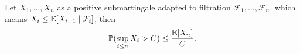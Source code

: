 \begin{lemma}
\label{lem:doob}
    Let $X_1, \dots, X_n$ as a positive submartingale adapted to filtration $\mathcal{F}_1, \ldots, \mathcal{F}_n$, which means $X_i \le \mathbb{E}[X_{i + 1} \mid  \mathcal{F}_i]$, then 
    \begin{align*}
        \mathbb{P}( \sup_{i \le n} X_i > C) \le \frac{\mathbb{E}[X_n]}{C}.
    \end{align*}
\end{lemma}
